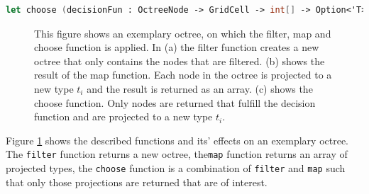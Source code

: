 \begin{lstlisting}[language = FSharp]
let choose (decisionFun : OctreeNode -> GridCell -> int[] -> Option<'T>*bool) (tree: Octree) :('T[]) = ...
\end{lstlisting}


\begin{figure}[h]
    \centering
    \par\medskip
    \par\medskip        
    \caption{This figure shows an exemplary octree, on which the filter, map and choose function is applied. In (a) the filter function creates a new octree that only contains the nodes that are filtered. (b) shows the result of the map function. Each node in the octree is projected to a new type $t_{i}$ and the result is returned as an array. (c) shows the choose function. Only nodes are returned that fulfill the decision function and are projected to a new type $t_{i}$. }
    \label{fig:octreeFuns}
\end{figure}


Figure \ref{fig:octreeFuns} shows the described functions and its' effects on an exemplary octree. The \verb|filter| function returns a new octree, the\verb|map| function returns an array of projected types, the \verb|choose| function is a combination of \verb|filter| and \verb|map| such that only those projections are returned that are of interest. 


